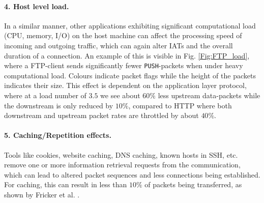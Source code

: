 \paragraph{4. Host level load.}
In a similar manner, other applications exhibiting significant computational load (CPU, memory, I/O) on the host machine can affect the processing speed of incoming and outgoing traffic, which can again alter IATs and the overall duration of a connection. An example of this is visible in Fig. \ref{Fig:FTP_load}, where a FTP-client sends significantly fewer \texttt{PUSH}-packets when under heavy computational load. Colours indicate packet flags while the height of the packets indicates their size. This effect is dependent on the application layer protocol, where at a load number of $3.5$ we see about $60\%$ less upstream data-packets while the downstream is only reduced by $10\%$, compared to HTTP where both downstream and upstream packet rates are throttled by about $40\%$.





\paragraph{5. Caching/Repetition effects.}
Tools like cookies, website caching, DNS caching, known hosts in SSH, etc. remove one or more information retrieval requests from the communication, which can lead to altered packet sequences and less connections being established. For caching, this can result in less than $10\%$ of packets being transferred, as shown by Fricker et al. \cite{fricker2012impact}. 



